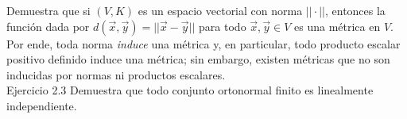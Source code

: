 \documentclass[12pt,dvipsnames]{article}
\numberwithin{equation}{section}
\begin{document}
\noindent Demuestra que si $(V,K)$ es un espacio vectorial con norma $||\cdot||$, entonces la función dada por $d(\vec{x},\vec{y})=||\vec{x}-\vec{y}||$ para todo $\vec{x},\vec{y}\in V$ es una métrica en $V$. Por ende, toda norma \emph{induce} una métrica y, en particular, todo producto escalar positivo definido induce una métrica; sin embargo, existen métricas que no son inducidas por normas ni productos escalares. \\

Ejercicio 2.3 Demuestra que todo conjunto ortonormal finito es linealmente independiente. \\

\end{document}
